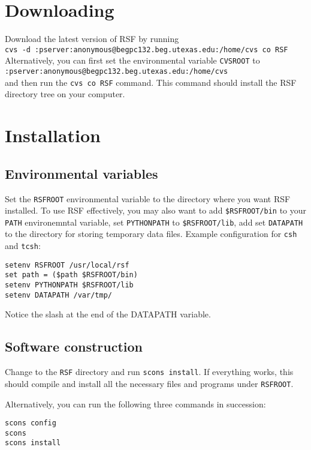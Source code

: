 \section{Downloading}

Download the latest version of RSF by running \\
\texttt{cvs~-d~:pserver:anonymous@begpc132.beg.utexas.edu:/home/cvs~co~RSF} \\
Alternatively, you can first set the environmental variable \texttt{CVSROOT}
to  \\ \texttt{:pserver:anonymous@begpc132.beg.utexas.edu:/home/cvs} \\
and then run the \texttt{cvs co RSF} command. This command should install the
RSF directory tree on your computer.

\section{Installation}

\subsection{Environmental variables}

Set the \texttt{RSFROOT} environmental variable to the directory where
you want RSF installed. To use RSF effectively, you may also want to add
\texttt{\$RSFROOT/bin} to your \texttt{PATH} environemntal variable, set
\texttt{PYTHONPATH} to \texttt{\$RSFROOT/lib}, add set \texttt{DATAPATH} to
the directory for storing temporary data files. Example configuration for
\texttt{csh} and \texttt{tcsh}:
\begin{verbatim}
setenv RSFROOT /usr/local/rsf
set path = ($path $RSFROOT/bin)
setenv PYTHONPATH $RSFROOT/lib
setenv DATAPATH /var/tmp/
\end{verbatim}
Notice the slash at the end of the DATAPATH variable.

\subsection{Software construction}

Change to the \texttt{RSF} directory and run \texttt{scons install}. If
everything works, this should compile and install all the necessary files and
programs under \texttt{RSFROOT}.

Alternatively, you can run the following three commands in succession: 
\begin{verbatim}
scons config
scons
scons install
\end{verbatim}

